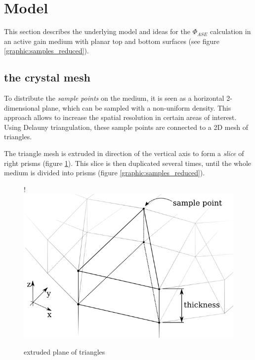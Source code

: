 \section{Model}

This section describes the underlying model and ideas for the $\Phi_{ASE}$
calculation in an active gain medium with planar top and bottom surfaces (see
figure \ref{graphic:samples_reduced}).



\subsection{the crystal mesh} \label{subsec:meshSampling}

To distribute the \emph{sample points} on the medium, it is seen as a
horizontal 2-dimensional plane, which can be sampled with a non-uniform
density. This approach allows to increase the spatial resolution in certain
areas of interest. Using Delauny triangulation, these sample points are
connected to a 2D mesh of triangles.

The triangle mesh is extruded in direction of the vertical axis to form a
\emph{slice} of right prisms (figure \ref{graphic:extruded_mesh}). This
slice is then duplicated several times, until the whole medium is divided into
prisms (figure \ref{graphic:samples_reduced}).

\begin{figure}
  \centerline{
     {!} {\includegraphics{graphics/delauny_3.png}}
  }
  \caption{extruded plane of triangles}
  \label{graphic:extruded_mesh}
\end{figure}

